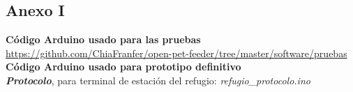 \documentclass[12pt]{article}
\begin{document}
	\pagebreak
	
	\subsection*{Anexo I}
	\label{anexo I: codigo}
	
	\noindent \textbf{Código Arduino usado para las pruebas}\\
	
	\noindent \small \url{https://github.com/ChiaFranfer/open-pet-feeder/tree/master/software/pruebas}\\

	\noindent \textbf{Código Arduino usado para prototipo definitivo} \\
	
	\noindent \textit{\textbf{Protocolo}}, para terminal de estación del refugio: \textit{refugio\_protocolo.ino} \\
	
\end{document}
